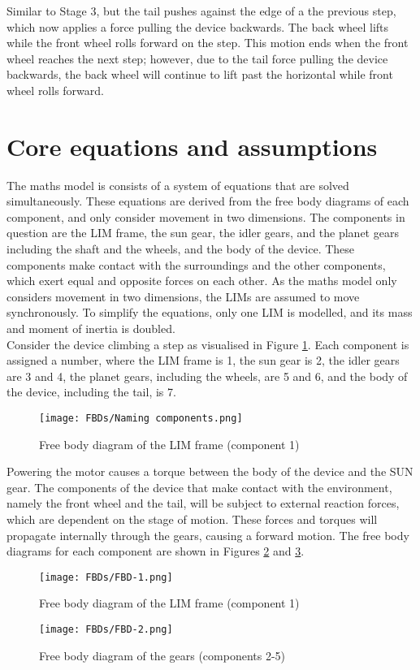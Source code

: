 Similar to Stage 3, but the tail pushes against the edge of a the previous step, which now applies a force pulling the device backwards. The back wheel lifts while the front wheel rolls forward on the step. This motion ends when the front wheel reaches the next step; however, due to the tail force pulling the device backwards, the back wheel will continue to lift past the horizontal while front wheel rolls forward.\\


\section{Core equations and assumptions}

The maths model is consists of a system of equations that are solved simultaneously. These equations are derived from the free body diagrams of each component, and only consider movement in two dimensions. The components in question are the LIM frame, the sun gear, the idler gears, and the planet gears including the shaft and the wheels, and the body of the device. These components make contact with the surroundings and the other components, which exert equal and opposite forces on each other. As the maths model only considers movement in two dimensions, the LIMs are assumed to move synchronously. To simplify the equations, only one LIM is modelled, and its mass and moment of inertia is doubled.\\

Consider the device climbing a step as visualised in Figure \ref{Component-names}. Each component is assigned a number, where the LIM frame is 1, the sun gear is 2, the idler gears are 3 and 4, the planet gears, including the wheels, are 5 and 6, and the body of the device, including the tail, is 7.
\begin{figure}[h]
	\centering
	\texttt{[image: FBDs/Naming components.png]}
	\caption{Free body diagram of the LIM frame (component 1)}
	\label{Component-names}
\end{figure}
Powering the motor causes a torque between the body of the device and the SUN gear. The components of the device that make contact with the environment, namely the front wheel and the tail, will be subject to external reaction forces, which are dependent on the stage of motion. These forces and torques will propagate internally through the gears, causing a forward motion. The free body diagrams for each component are shown in Figures \ref{FBD-1} and \ref{FBD-2}.\\
\begin{figure}[h]
	\centering
	\texttt{[image: FBDs/FBD-1.png]}
	\caption{Free body diagram of the LIM frame (component 1)}
	\label{FBD-1}
\end{figure}
\begin{figure}[!h]
	\centering
	\texttt{[image: FBDs/FBD-2.png]}
	\caption{Free body diagram of the gears (components 2-5)}
	\label{FBD-2}
\end{figure}

